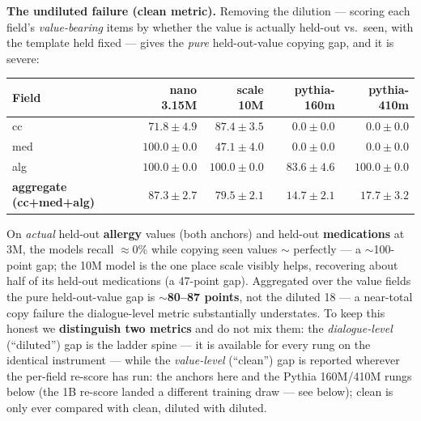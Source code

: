 \documentclass[11pt]{article}
\begin{document}
\textbf{The undiluted failure (clean metric).} Removing the dilution --- scoring each field's \emph{value-bearing} items by whether the value is actually held-out vs.~seen, with the template held fixed --- gives the \emph{pure} held-out-value copying gap, and it is severe:

 \begin{center}
\begin{tabular}{lrrrr}
\toprule
Field & nano 3.15M & scale 10M & pythia-160m & pythia-410m \\
\midrule
cc & $71.8\pm4.9$ & $87.4\pm3.5$ & $\mathbf{0.0}\pm\mathbf{0.0}$ & $\mathbf{0.0}\pm\mathbf{0.0}$ \\
med & $\mathbf{100.0}\pm\mathbf{0.0}$ & $47.1\pm4.0$ & $\mathbf{0.0}\pm\mathbf{0.0}$ & $\mathbf{0.0}\pm\mathbf{0.0}$ \\
alg & $\mathbf{100.0}\pm\mathbf{0.0}$ & $100.0\pm0.0$ & $\mathbf{83.6}\pm\mathbf{4.6}$ & $\mathbf{100.0}\pm\mathbf{0.0}$ \\
\textbf{aggregate (cc+med+alg)} & $\mathbf{87.3}\pm\mathbf{2.7}$ & $\mathbf{79.5}\pm\mathbf{2.1}$ & $\mathbf{14.7}\pm\mathbf{2.1}$ & $\mathbf{17.7}\pm\mathbf{3.2}$ \\
\bottomrule
\end{tabular}
\end{center}

On \emph{actual} held-out \textbf{allergy} values (both anchors) and held-out \textbf{medications} at 3M, the models recall $\approx$0\% while copying seen values $\sim$ perfectly --- a $\sim$100-point gap; the 10M model is the one place scale visibly helps, recovering about half of its held-out medications (a 47-point gap). Aggregated over the value fields the pure held-out-value gap is \textbf{$\sim$80--87 points}, not the diluted 18 --- a near-total copy failure the dialogue-level metric substantially understates. To keep this honest we \textbf{distinguish two metrics} and do not mix them: the \emph{dialogue-level} (``diluted'') gap is the ladder spine --- it is available for every rung on the identical instrument --- while the \emph{value-level} (``clean'') gap is reported wherever the per-field re-score has run: the anchors here and the Pythia 160M/410M rungs below (the 1B re-score landed a different training draw --- see below); clean is only ever compared with clean, diluted with diluted.
\end{document}
